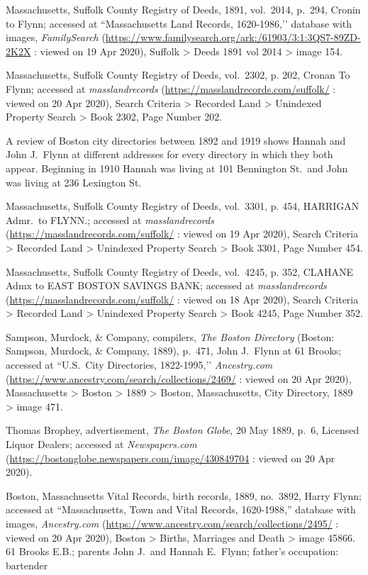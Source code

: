 \begin{thebibliography}{999}
	Massachusetts, Suffolk County Registry of Deeds, 1891, vol.\ 2014, p.\ 294, Cronin to Flynn; accessed at ``Massachusetts Land Records, 1620-1986,’’ database with images, \textit{FamilySearch} (\url{https://www.familysearch.org/ark:/61903/3:1:3QS7-89ZD-2K2X} : viewed on 19 Apr 2020), Suffolk > Deeds 1891 vol 2014 > image 154.
	
	Massachusetts, Suffolk County Registry of Deeds, vol.\ 2302, p. 202, Cronan To Flynn; accessed at \textit{masslandrecords} (\url{https://masslandrecords.com/suffolk/} : viewed on 20 Apr 2020), Search Criteria > Recorded Land > Unindexed Property Search > Book 2302, Page Number 202.
	
	A review of Boston city directories between 1892 and 1919 shows Hannah and John J.\ Flynn at different addresses for every directory in which they both appear. Beginning in 1910 Hannah was living at 101 Bennington St.\ and John was living at 236 Lexington St.
	
	Massachusetts, Suffolk County Registry of Deeds, vol.\ 3301, p. 454, HARRIGAN Admr.\ to FLYNN.; accessed at \textit{masslandrecords} (\url{https://masslandrecords.com/suffolk/} : viewed on 19 Apr 2020), Search Criteria > Recorded Land > Unindexed Property Search >  Book 3301, Page Number 454.
	
	Massachusetts, Suffolk County Registry of Deeds, vol.\ 4245, p. 352, CLAHANE Admx to EAST BOSTON SAVINGS BANK; accessed at \textit{masslandrecords} (\url{https://masslandrecords.com/suffolk/} : viewed on 18 Apr 2020), Search Criteria > Recorded Land > Unindexed Property Search > Book 4245, Page Number 352.
	
	Sampson, Murdock, \& Company, compilers, \textit{The Boston Directory} (Boston: Sampson, Murdock, \& Company, 1889), p.\ 471, John J.\ Flynn at 61 Brooks; accessed at ``U.S.\ City Directories, 1822-1995,’’ \textit{Ancestry.com} (\url{https://www.ancestry.com/search/collections/2469/} : viewed on 20 Apr 2020), Massachusetts > Boston > 1889 > Boston, Massachusetts, City Directory, 1889 > image 471.
	
	Thomas Brophey, advertisement, \textit{The Boston Globe}, 20 May 1889, p.\ 6, Licensed Liquor Dealers; accessed at \textit{Newspapers.com} (\url{https://bostonglobe.newspapers.com/image/430849704} : viewed on 20 Apr 2020).
	
	Boston, Massachusetts Vital Records, birth records, 1889, no.\ 3892, Harry Flynn; accessed at ``Massachusetts, Town and Vital Records, 1620-1988,'' database with images, \textit{Ancestry.com} (\url{https://www.ancestry.com/search/collections/2495/} : viewed on 20 Apr 2020), Boston > Births, Marriages and Death > image 45866.\\
	61 Brooks E.B.; parents John J.\ and Hannah E.\ Flynn; father's occupation: bartender
	

\end{thebibliography}
